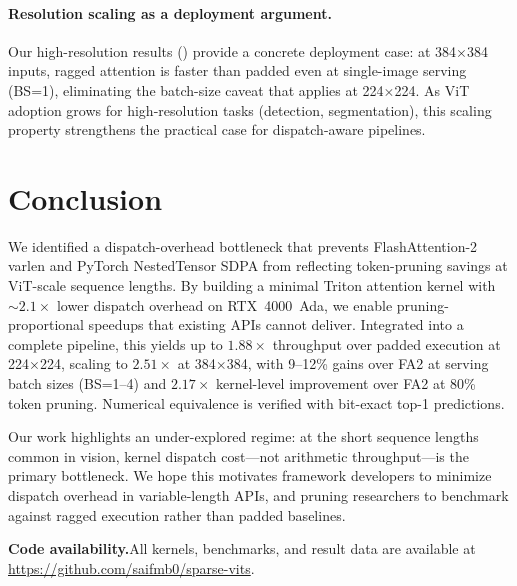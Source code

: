 \documentclass[conference]{IEEEtran}
\begin{document}
\paragraph{Resolution scaling as a deployment argument.}
Our high-resolution results () provide a concrete
deployment case: at 384$\times$384 inputs, ragged attention is faster
than padded even at single-image serving (BS=1), eliminating the
batch-size caveat that applies at 224$\times$224.
As ViT adoption grows for high-resolution tasks (detection,
segmentation), this scaling property strengthens the practical case
for dispatch-aware pipelines.

\section{Conclusion}\label{sec:conclusion}

We identified a dispatch-overhead bottleneck that prevents
FlashAttention-2 varlen and PyTorch NestedTensor SDPA from reflecting
token-pruning savings at ViT-scale sequence lengths.
By building a minimal Triton attention kernel with ${\sim}2.1\times$
lower dispatch overhead on RTX~4000~Ada, we enable pruning-proportional
speedups that existing APIs cannot deliver.
Integrated into a complete pipeline, this yields up to
$1.88\times$ throughput over padded execution at 224$\times$224,
scaling to $2.51\times$ at 384$\times$384, with 9--12\% gains over
FA2 at serving batch sizes (BS=1--4) and $2.17\times$ kernel-level
improvement over FA2 at 80\% token pruning.
Numerical equivalence is verified with bit-exact top-1 predictions.

Our work highlights an under-explored regime: at the short sequence
lengths common in vision, kernel dispatch cost---not arithmetic
throughput---is the primary bottleneck.
We hope this motivates framework developers to minimize dispatch
overhead in variable-length APIs, and pruning researchers to benchmark
against ragged execution rather than padded baselines.

\medskip
\noindent\textbf{Code availability.}\;All kernels, benchmarks, and
result data are available at
\url{https://github.com/saifmb0/sparse-vits}.
\end{document}
